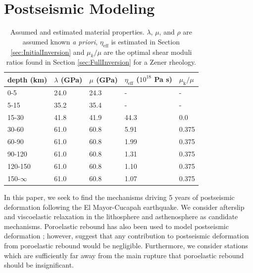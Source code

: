 \documentclass[1p]{elsarticle}
\begin{document}
\section{Postseismic Modeling}\label{sec:Model}

\begin{table}\label{tab:MaterialProperties}
\begin{tabular} {l l l l l}
depth (km) &$\lambda$ (GPa)&$\mu$ (GPa)&$\eta_\mathrm{eff}$ ($10^{18}$ Pa s) & $\mu_\mathrm{k}/\mu$\\ \hline
0-5 & 24.0 & 24.3 & - & -\\
5-15 & 35.2 & 35.4 & - & -\\
15-30 & 41.8 & 41.9 & 44.3 & 0.0\\
30-60 & 61.0 & 60.8 & 5.91 & 0.375\\
60-90 & 61.0 & 60.8 & 1.99 & 0.375\\
90-120 & 61.0 & 60.8 & 1.31 & 0.375\\
120-150 & 61.0 & 60.8 & 1.10 & 0.375\\
150-$\infty$ & 61.0 & 60.8 & 1.07 & 0.375\\
\end{tabular}
\caption{Assumed and estimated material properties. $\lambda$, $\mu$, and $\rho$ are assumed known \textit{a priori}, $\eta_\mathrm{eff}$ is estimated in Section \ref{sec:InitialInversion} and $\mu_k/\mu$ are the optimal shear moduli ratios found in Section \ref{sec:FullInversion} for a Zener rheology.} 

\end{table}
In this paper, we seek to find the mechanisms driving 5 years of postseismic deformation following the El Mayor-Cucapah earthquake. We consider afterslip and viscoelastic relaxation in the lithosphere and asthenosphere as candidate mechanisms.  Poroelastic rebound has also been used to model postseismic deformation \citep[e.g.][]{Jonsson2003}; however, \citet{Gonzalez-ortega2014} suggest that any contribution to postseismic deformation from poroelastic rebound would be negligible. Furthermore, we consider stations which are sufficiently far away from the main rupture that poroelastic rebound should be insignificant.  
\end{document}

